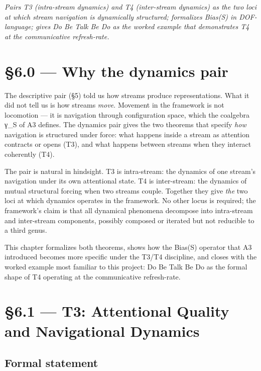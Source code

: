 \documentclass[11pt, openany]{book}
\newcommand{\sectionbreak}{\clearpage}
\begin{document}
\textit{Pairs T3 (intra-stream dynamics) and T4 (inter-stream dynamics) as the two loci at which stream navigation is dynamically structured; formalizes Bias(S) in DOF-language; gives Do Be Talk Be Do as the worked example that demonstrates T4 at the communicative refresh-rate.}

\sectionbreak

\section{§6.0 --- Why the dynamics pair}

The descriptive pair (§5) told us how streams produce representations. What it did not tell us is how streams \textit{move}. Movement in the framework is not locomotion --- it is navigation through configuration space, which the coalgebra γ\_\allowbreak{}S of A3 defines. The dynamics pair gives the two theorems that specify \textit{how} navigation is structured under force: what happens inside a stream as attention contracts or opens (T3), and what happens between streams when they interact coherently (T4).

The pair is natural in hindsight. T3 is intra-stream: the dynamics of one stream's navigation under its own attentional state. T4 is inter-stream: the dynamics of mutual structural forcing when two streams couple. Together they give \textit{the} two loci at which dynamics operates in the framework. No other locus is required; the framework's claim is that all dynamical phenomena decompose into intra-stream and inter-stream components, possibly composed or iterated but not reducible to a third genus.

This chapter formalizes both theorems, shows how the Bias(S) operator that A3 introduced becomes more specific under the T3/T4 discipline, and closes with the worked example most familiar to this project: Do Be Talk Be Do as the formal shape of T4 operating at the communicative refresh-rate.

\sectionbreak

\section{§6.1 --- T3: Attentional Quality and Navigational Dynamics}

\subsection{Formal statement}
\end{document}
